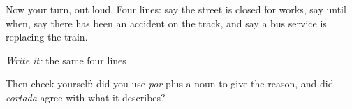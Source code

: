 \begin{tcolorbox}[breakable,colback=teal!4,colframe=teal!35!black,title={Before you move on}]
Now your turn, out loud. Four lines: say the street is closed for works, say until when, say there has been an accident on the track, and say a bus service is replacing the train.

\emph{Write it:} the same four lines

Then check yourself: did you use \emph{por} plus a noun to give the reason, and did \emph{cortada} agree with what it describes?
\end{tcolorbox}
